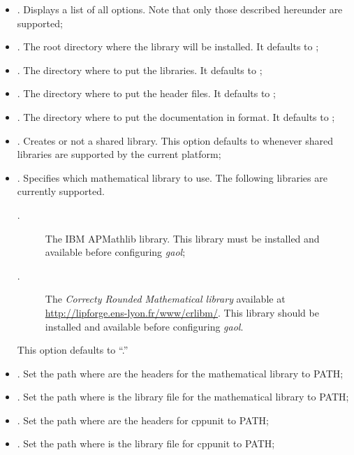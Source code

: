 \documentclass{manual}
\begin{document}
\begin{itemize}
\item {}. Displays a list of all options. Note that only
those described hereunder are supported;
%
\item {}. The root directory where the library
will be installed. It defaults to ;
\item {}. The directory where to put the
libraries. It defaults to ;
\item {}. The directory where to
put the header files. It defaults to ;
\item {}. The directory where to put the
documentation in  format. It defaults to ;
\item {}. Creates or not a shared
library. This option defaults to  whenever shared libraries
are supported by the current platform;
\item {}. Specifies which mathematical library to use.
  The following libraries are currently supported.
\begin{description}
 \item[.] The IBM APMathlib library. This library must be installed and available before configuring \emph{gaol};
 \item[.] The \emph{Correcty Rounded Mathematical library} available at \url{http://lipforge.ens-lyon.fr/www/crlibm/}.
	This library should be installed and available before configuring \emph{gaol}.
\end{description}
  This option defaults to ``.''
\item {}. Set the path where are the headers for the mathematical
  library to PATH;
\item {}. Set the path where is the library file for the mathematical
  library to PATH;
\item {}. Set the path where are the headers for cppunit
  to PATH;
\item {}. Set the path where is the library file for cppunit to PATH;

\end{itemize}
\end{document}
